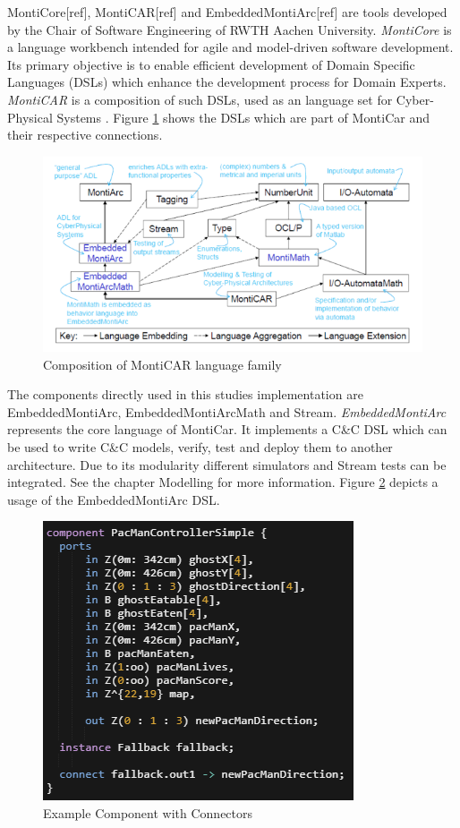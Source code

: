 MontiCore[ref], MontiCAR[ref] and EmbeddedMontiArc[ref] are tools developed by the Chair of Software Engineering of RWTH Aachen University\cite{serwth}.
\emph{MontiCore} is a language workbench intended for agile and model-driven software development. Its primary objective is to enable efficient development of Domain Specific Languages (DSLs) which enhance the development process for Domain Experts. 
\emph{MontiCAR} is a composition of such DSLs, used as an language set for Cyber-Physical Systems \cite{seminarArmin}. Figure \ref{fig:MontiCAR} shows the DSLs which are part of MontiCar and their respective connections.
\begin{figure}
	\centering
	\includegraphics[scale=0.55]{pictures/MontiCarOverview.PNG}
	\caption{Composition of MontiCAR language family\cite{seminarArmin}}
	\label{fig:MontiCAR}
\end{figure}
The components directly used in this studies implementation are EmbeddedMontiArc, EmbeddedMontiArcMath and Stream.
\emph{EmbeddedMontiArc} represents the core language of MontiCar. It implements a C\&C DSL which can be used to write C\&C models, verify, test and deploy them to another architecture. Due to its modularity different simulators and Stream tests can be integrated. See the chapter Modelling for more information. Figure \ref{fig:EMontiArc} depicts a usage of the EmbeddedMontiArc DSL.

\begin{figure}[!h]
	\centering
	\includegraphics[scale=0.55]{pictures/EMA.PNG}
	\caption{Example Component with Connectors}
	\label{fig:EMontiArc}
\end{figure}

